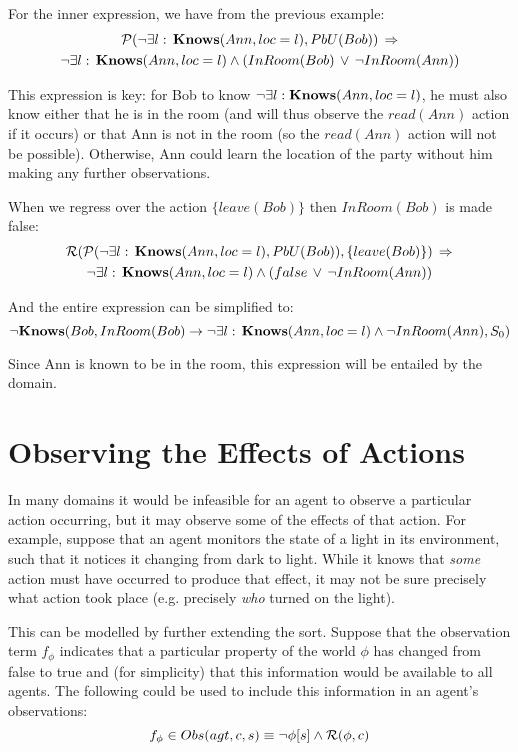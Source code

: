 For the inner expression, we have from the previous example:\begin{multline*}
\mathcal{P}(\neg\exists l:\,\mathbf{Knows}(Ann,loc=l),PbU(Bob))\,\Rightarrow\\
\neg\exists l:\,\mathbf{Knows}(Ann,loc=l)\wedge\left(InRoom(Bob)\,\vee\,\neg InRoom(Ann)\right)\end{multline*}


This expression is key: for Bob to know $\neg\exists l:\mathbf{Knows}(Ann,loc=l)$,
he must also know either that he is in the room (and will thus observe
the $read(Ann)$ action if it occurs) or that Ann is not in the room
(so the $read(Ann)$ action will not be possible). Otherwise, Ann
could learn the location of the party without him making any further
observations.

When we regress over the action $\{leave(Bob)\}$ then $InRoom(Bob)$
is made false:\begin{multline*}
\mathcal{R}(\mathcal{P}(\neg\exists l:\,\mathbf{Knows}(Ann,loc=l),PbU(Bob)),\{leave(Bob)\})\,\Rightarrow\\
\neg\exists l:\,\mathbf{Knows}(Ann,loc=l)\wedge\left(false\,\vee\,\neg InRoom(Ann)\right)\end{multline*}


And the entire expression can be simplified to:\[
\neg\mathbf{Knows}(Bob,InRoom(Bob)\rightarrow\neg\exists l:\,\mathbf{Knows}(Ann,loc=l)\wedge\neg InRoom(Ann),S_{0})\]


Since Ann is known to be in the room, this expression will be entailed
by the domain.


\section{Observing the Effects of Actions\label{sub:Observing-Effects}}

In many domains it would be infeasible for an agent to observe a particular
action occurring, but it may observe some of the effects of that action.
For example, suppose that an agent monitors the state of a light in
its environment, such that it notices it changing from dark to light.
While it knows that \emph{some} action must have occurred to produce
that effect, it may not be sure precisely what action took place (e.g.
precisely \emph{who} turned on the light).

This can be modelled by further extending the 
sort. Suppose that the observation term $f_{\phi}$ indicates that
a particular property of the world $\phi$ has changed from false
to true and (for simplicity) that this information would be available
to all agents. The following could be used to include this information
in an agent's observations:\[
f_{\phi}\in Obs(agt,c,s)\equiv\neg\phi[s]\wedge\mathcal{R}(\phi,c)\]


